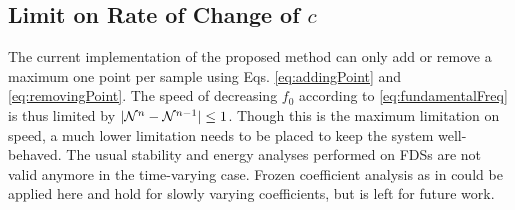 \subsection{Limit on Rate of Change of $c$}
The current implementation of the proposed method can only add or remove a maximum one point per sample using Eqs. \eqref{eq:addingPoint} and \eqref{eq:removingPoint}. The speed of decreasing $f_0$ according to \eqref{eq:fundamentalFreq} is thus limited by $|\mathcal{N}^n - \mathcal{N}^{n-1}| \leq 1$. Though this is the maximum limitation on speed, a much lower limitation needs to be placed to keep the system well-behaved. The usual stability and energy analyses performed on FDSs are not valid anymore in the time-varying case. Frozen coefficient analysis as in \cite{Strikwerda1989} could be applied here and hold for slowly varying coefficients, but is left for future work. 

